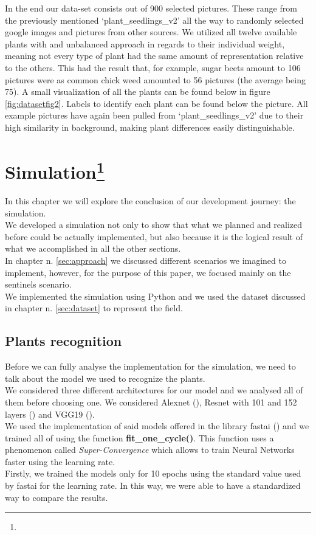 \documentclass[english]{lni}
\begin{document}
In the end our data-set consists out of 900 selected pictures. These range from the previously mentioned ‘plant\_seedlings\_v2’ all the way to randomly selected google images and pictures from other sources. We utilized all twelve available plants with and unbalanced approach in regards to their individual weight, meaning not every type of plant had the same amount of representation relative to the others. This had the result that, for example, sugar beets amount to 106 pictures were as common chick weed amounted to 56 pictures (the average being 75). A small visualization of all the plants can be found below in figure \ref{fig:datasetfig2}. Labels to identify each plant can be found below the picture. All example pictures have again been pulled from ‘plant\_seedlings\_v2’ due to their high similarity in background, making plant differences easily distinguishable.

\newpage

\section[Simulation]{Simulation\protect\footnote{ }}\label{sec:simu}
In this chapter we will explore the conclusion of our development journey: the simulation. \\
We developed a simulation not only to show that what we planned and realized before could be actually implemented, but also because it is the logical result of what we accomplished in all the other sections. \\
In chapter n. \ref{sec:approach} we discussed different scenarios we imagined to implement, however, for the purpose of this paper, we focused mainly on the sentinels scenario.\\
We implemented the simulation using Python and we used the dataset discussed in chapter n. \ref{sec:dataset} to represent the field. 
\subsection{Plants recognition}
Before we can fully analyse the implementation for the simulation, we need to talk about the model we used to recognize the plants. \\
We considered three different architectures for our model and we analysed all of them before choosing one. We considered Alexnet (\cite{DBLP:journals/corr/RussakovskyDSKSMHKKBBF14}), Resnet with 101 and 152 layers (\cite{DBLP:journals/corr/HeZRS15}) and VGG19 (\cite{simonyan2015deep}). \\
We used the implementation of said models offered in the library fastai (\cite{fastai}) and we trained all of using the function  \textbf{fit\_one\_cycle()}. This function uses a phenomenon called \textit{Super-Convergence} which allows to train Neural Networks faster using the learning rate. \cite{DBLP:journals/corr/abs-1708-07120}\\
Firstly, we trained the models only for 10 epochs using the standard value used by fastai for the learning rate. In this way, we were able to have a standardized way to compare the results. \\
\end{document}
